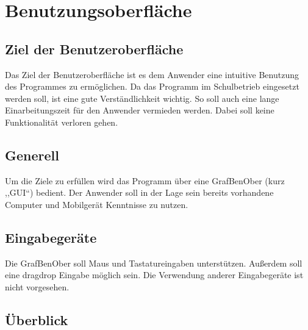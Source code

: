 \documentclass[parskip=full]{scrartcl}
\begin{document}
\clearpage
\section{Benutzungsoberfläche}\label{gui}

\subsection{Ziel der Benutzeroberfläche}

Das Ziel der Benutzeroberfläche ist es dem Anwender eine intuitive Benutzung des Programmes zu ermöglichen. Da das Programm im Schulbetrieb eingesetzt werden soll, ist eine gute Verständlichkeit wichtig. So soll auch eine lange Einarbeitungszeit für den Anwender vermieden werden. Dabei soll keine Funktionalität verloren gehen.

\subsection{Generell}

Um die Ziele zu erfüllen wird das Programm über eine \gls{GrafBenOber} (kurz ,,GUI``) bedient. Der Anwender soll in der Lage sein bereits vorhandene Computer und Mobilgerät Kenntnisse zu nutzen.

\subsection{Eingabegeräte}

Die \gls{GrafBenOber} soll Maus und Tastatureingaben unterstützen. Außerdem soll eine \gls{dragdrop} Eingabe möglich sein.
Die Verwendung anderer Eingabegeräte ist nicht vorgesehen.

\subsection{Überblick}
\end{document}
